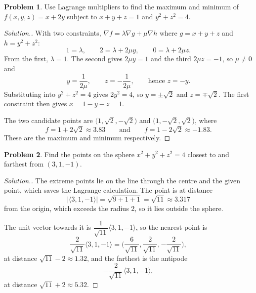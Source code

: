\documentclass[11pt,a4paper]{article}
\theoremstyle{definition}
\newtheorem{problemx}{Problem}[subsection]
\newenvironment{problem}{\begin{problemx}}{\end{problemx}}
\newenvironment{solution}
  {\renewcommand{\qedsymbol}{}\begin{proof}[\textit{Solution}.]}
  {\end{proof}}
\begin{document}
\begin{problem}
Use Lagrange multipliers to find the maximum and minimum of $f(x,y,z) = x+2y$
subject to $x+y+z = 1$ and $y^2+z^2 = 4$.
\end{problem}
\begin{solution}
With two constraints, $\nabla f = \lambda\nabla g + \mu\nabla h$ where
$g = x+y+z$ and $h = y^2+z^2$:
$$1 = \lambda,\qquad 2 = \lambda + 2\mu y,\qquad 0 = \lambda + 2\mu z .$$
From the first, $\lambda = 1$. The second gives $2\mu y = 1$ and the third
$2\mu z = -1$, so $\mu\neq 0$ and
$$y = \frac{1}{2\mu},\qquad z = -\frac{1}{2\mu},\qquad\text{hence } z = -y .$$
Substituting into $y^2+z^2 = 4$ gives $2y^2 = 4$, so
$y = \pm\sqrt2$ and $z = \mp\sqrt2$. The first constraint then gives
$x = 1-y-z = 1$.

The two candidate points are $\big(1, \sqrt2, -\sqrt2\big)$ and
$\big(1, -\sqrt2, \sqrt2\big)$, where
$$f = 1+2\sqrt2 \approx 3.83 \qquad\text{and}\qquad f = 1-2\sqrt2\approx -1.83 .$$
These are the maximum and minimum respectively.
\end{solution}

\begin{problem}
Find the points on the sphere $x^2+y^2+z^2 = 4$ closest to and farthest from
$(3,1,-1)$.
\end{problem}
\begin{solution}
The extreme points lie on the line through the centre and the given point, which
saves the Lagrange calculation. The point is at distance
$$\left|\langle 3,1,-1\rangle\right| = \sqrt{9+1+1} = \sqrt{11}\approx 3.317$$
from the origin, which exceeds the radius $2$, so it lies outside the sphere.

The unit vector towards it is $\dfrac{1}{\sqrt{11}}\langle 3,1,-1\rangle$, so
the nearest point is
$$\frac{2}{\sqrt{11}}\langle 3,1,-1\rangle
= \Big(\frac{6}{\sqrt{11}}, \frac{2}{\sqrt{11}}, -\frac{2}{\sqrt{11}}\Big),$$
at distance $\sqrt{11}-2\approx 1.32$, and the farthest is the antipode
$$-\frac{2}{\sqrt{11}}\langle 3,1,-1\rangle ,$$
at distance $\sqrt{11}+2\approx 5.32$.
\end{solution}
\end{document}

